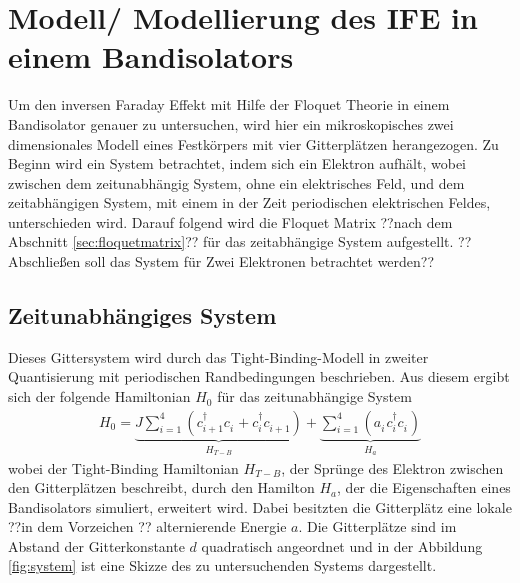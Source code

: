 \chapter{Modell/ Modellierung des IFE in einem Bandisolators}
\label{sec:model}
Um den inversen Faraday Effekt mit Hilfe der Floquet Theorie in
einem Bandisolator genauer zu untersuchen, wird hier ein mikroskopisches zwei dimensionales Modell
eines Festkörpers mit vier Gitterplätzen herangezogen. Zu Beginn
wird ein System betrachtet, indem sich ein Elektron aufhält, wobei zwischen dem
zeitunabhängig System, ohne ein elektrisches Feld,
und dem zeitabhängigen System, mit einem in der Zeit periodischen elektrischen Feldes, unterschieden wird.
Darauf folgend wird die Floquet Matrix ??nach dem Abschnitt \ref{sec:floquetmatrix}?? für das
zeitabhängige System aufgestellt. ??Abschließen soll das System für Zwei Elektronen betrachtet werden??




\section{Zeitunabhängiges System}
Dieses Gittersystem wird durch das Tight-Binding-Modell in zweiter Quantisierung mit periodischen Randbedingungen\cite{czycholl} beschrieben.
Aus diesem ergibt sich der folgende Hamiltonian $H_0$ für das zeitunabhängige System %
\begin{align}
  H_0=\underbrace{J\sum_{i=1}^4 \left(c_{i+1}^\dag c_i^{\phantom{\dag}} + c_{i}^\dag c_{i+1}^{\phantom{\dag}}\right)}_{H_{T-B}}
   +\underbrace{\sum_{i=1}^4\left( a_i^{\phantom{\dag}} c_i^\dag c_i^{\phantom{\dag}} \right)}_{H_a}
\end{align}
wobei der Tight-Binding Hamiltonian $H_{T-B}$, der Sprünge des Elektron
zwischen den Gitterplätzen beschreibt, durch den Hamilton $H_a$, der die Eigenschaften
eines Bandisolators simuliert, erweitert wird.
Dabei besitzten die Gitterplätz eine lokale ??in dem Vorzeichen ?? alternierende Energie $a$.
Die Gitterplätze sind im Abstand der Gitterkonstante $d$ quadratisch angeordnet
und in der Abbildung \ref{fig:system}
ist eine Skizze des zu untersuchenden Systems dargestellt.


